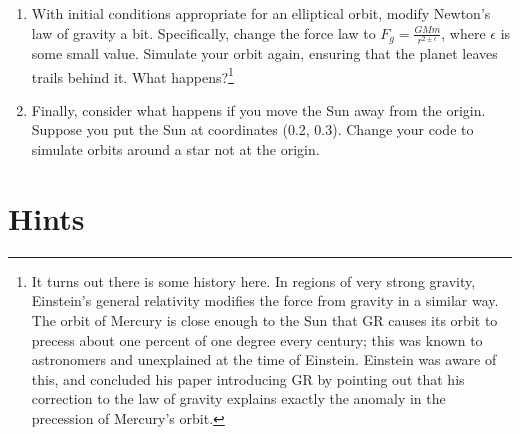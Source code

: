 \documentclass[12pt]{article}
\begin{document}
\begin{enumerate}
\item With initial conditions appropriate for an elliptical orbit, modify Newton's law of gravity a bit. Specifically, change the force law to $F_g = \frac{GMm}{r^{2 \pm \epsilon}}$, where $\epsilon$ is some small value. Simulate your orbit again, ensuring that the planet leaves trails behind it. What happens?\footnote{
It turns out there is some history here. In regions of very strong gravity, Einstein's general relativity modifies the force from gravity in a similar way. The orbit of 
Mercury is close enough to the Sun that GR causes its orbit to precess about one percent of one degree every century; this was known to astronomers and unexplained at the
time of Einstein. Einstein was aware of this, and concluded his paper introducing GR by pointing out that his correction to the law of gravity explains exactly the 
anomaly in the precession of Mercury's orbit.}



\item{Finally, consider what happens if you move the Sun away from the origin. Suppose you put the Sun at coordinates (0.2, 0.3). Change your code to simulate orbits around a star not at the origin.}

\end{enumerate}
\newpage
\section{Hints}
\end{document}
